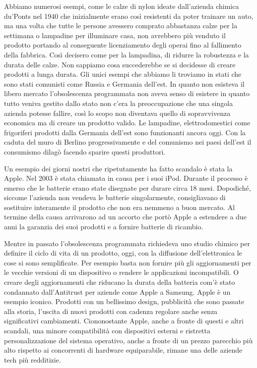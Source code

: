 \documentclass[12pt]{book} %
\begin{document}
Abbiamo numerosi esempi, come le calze di nylon ideate dall'azienda chimica du'Ponts nel 1940 che
inizialmente erano così resistenti da poter trainare un auto, ma una volta che tutte le persone avessero comprato
abbastanza calze per la settimana o lampadine per illuminare casa, non avrebbero più venduto il prodotto portando al
conseguente licenziamento degli operai fino al fallimento della fabbrica. Così decisero come per la lampadina, di
ridurre la robustezza e la durata delle calze. Non sappiamo cosa succederebbe se si decidesse di creare prodotti a
lunga durata. Gli unici esempi che abbiamo li troviamo in stati che sono stati comunisti come Russia e Germania
dell'est. In quanto non esisteva il libero mercato l'obsolescenza programmata
non aveva senso di esistere in quanto tutto veniva gestito dallo stato non c'era la preoccupazione
che una singola azienda potesse fallire, così lo scopo non diventava quello di sopravvivenza economica ma di creare un
prodotto valido. Le lampadine, elettrodomestici come frigoriferi prodotti dalla Germania dell'est
sono funzionanti ancora oggi. Con la caduta del muro di Berlino progressivamente e del comunismo nei paesi
dell'est il consumismo dilagò facendo sparire questi produttori.

Un esempio dei giorni nostri che ripetutamente ha fatto scandalo è stata la Apple. Nel 2003 è stata chiamata in causa
per i suoi iPod. Durante il processo è emerso che le batterie erano state disegnate per durare circa 18 mesi.
Dopodiché, siccome l'azienda non vendeva le batterie singolarmente, consigliavano di sostituire
interamente il prodotto che non era nemmeno a buon mercato. Al termine della causa arrivarono ad un accorto che portò
Apple a estendere a due anni la garanzia dei suoi prodotti e a fornire batterie di ricambio.

Mentre in passato l'obsolescenza programmata richiedeva uno studio chimico per definire il ciclo di
vita di un prodotto, oggi, con la diffusione dell'elettronica le cose si sono semplificate. Per
esempio basta non fornire più gli aggiornamenti per le vecchie versioni di un dispositivo o rendere le applicazioni
incompatibili. O creare degli aggiornamenti che riducano la durata della batteria com'è stato
condannato dall'Antitrust per aziende come Apple a Samsung. Apple è un esempio iconico. Prodotti
con un bellissimo design, pubblicità che sono passate alla storia, l'uscita di nuovi prodotti con cadenza regolare anche senza significativi cambiamenti. Ciononostante Apple, anche a fronte di questi e altri scandali, una minore compatibilità con dispositivi esterni e ristretta personalizzazione del sistema operativo, anche a fronte di un prezzo parecchio più alto rispetto ai concorrenti di hardware equiparabile, rimane una delle aziende tech più redditizie. 
\end{document}
